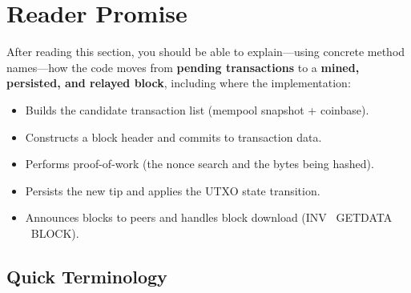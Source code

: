 \section{Reader Promise}
\label{sec:ch09-6-promise}

After reading this section, you should be able to explain---using concrete method names---how the code moves from \textbf{pending transactions} to a \textbf{mined, persisted, and relayed block}, including where the implementation:

\begin{itemize}
  \item Builds the candidate transaction list (mempool snapshot + coinbase).
  \item Constructs a block header and commits to transaction data.
  \item Performs proof-of-work (the nonce search and the bytes being hashed).
  \item Persists the new tip and applies the UTXO state transition.
  \item Announces blocks to peers and handles block download (INV \textrightarrow\ GETDATA \textrightarrow\ BLOCK).
\end{itemize}

\subsection{Quick Terminology}
\label{sec:ch09-6-terminology}

